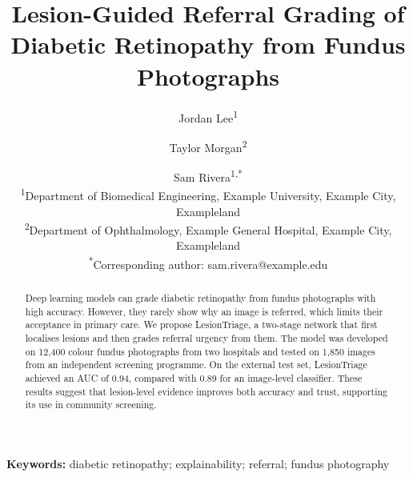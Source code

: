 \documentclass[10pt,twocolumn]{article}
\title{Lesion-Guided Referral Grading of Diabetic Retinopathy from Fundus Photographs}
\author{Jordan Lee\textsuperscript{1} \and Taylor Morgan\textsuperscript{2} \and Sam Rivera\textsuperscript{1,*}\\
\small\textsuperscript{1}Department of Biomedical Engineering, Example University, Example City, Exampleland\\
\small\textsuperscript{2}Department of Ophthalmology, Example General Hospital, Example City, Exampleland\\
\small\textsuperscript{*}Corresponding author: sam.rivera@example.edu}
\date{}
\begin{document}
\maketitle

\begin{abstract}
Deep learning models can grade diabetic retinopathy from fundus photographs with high accuracy.
However, they rarely show why an image is referred, which limits their acceptance in primary care.
We propose LesionTriage, a two-stage network that first localises lesions and then grades referral urgency from them.
The model was developed on 12,400 colour fundus photographs from two hospitals and tested on 1,850 images from an independent screening programme.
On the external test set, LesionTriage achieved an AUC of 0.94, compared with 0.89 for an image-level classifier.
These results suggest that lesion-level evidence improves both accuracy and trust, supporting its use in community screening.
\end{abstract}

\noindent\textbf{Keywords:} diabetic retinopathy; explainability; referral; fundus photography









\end{document}
